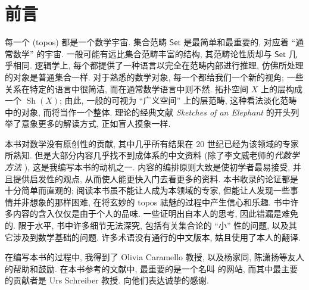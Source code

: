 \chapter{前言}


每一个\topos{} (topos) 都是一个数学宇宙. 集合范畴 $\mathsf {Set}$ 是最简单和最重要的\topos{}, 对应着 ``通常数学'' 的宇宙. 一般\topos{}可能有远比集合范畴丰富的结构, 其范畴论性质却与 $\mathsf {Set}$ 几乎相同. 逻辑学上, 每个\topos{}都提供了一种语言以完全在范畴内部进行推理, 仿佛所处理的对象是普通集合一样. 对于熟悉的数学对象, 每一个\topos{}都给我们一个新的视角; 一些关系在特定\topos{}的语言中很简洁, 而在通常数学语言中则不然. 拓扑空间 $X$ 上的层构成一个\topos{} $\operatorname{Sh}(X)$; 由此, 一般的\topos{}可视为 ``广义空间'' 上的层范畴, 这种看法淡化范畴中的对象, 而将\topos{}当作一个整体. \topos{}理论的经典文献 \textit{Sketches of an Elephant} \cite{Elephant} 的开头列举了意象更多的解读方式, 正如盲人摸象一样.

本书对数学没有原创性的贡献, 其中几乎所有结果在 20 世纪已经为该领域的专家所熟知. 但是大部分内容几乎找不到成体系的中文资料 (除了李文威老师的\emph{代数学方法} \cite{lww2}), 这是我编写本书的动机之一. 内容的编排原则大致是使初学者最易接受, 并且提供启发性的观点, 从而使人能更快入门去看更多的资料. 本书收录的论证都是十分简单而直观的; 阅读本书虽不能让人成为本领域的专家, 但能让人发现一些事情并非想象的那样困难, 在将玄妙的 topos 祛魅的过程中产生信心和乐趣. 书中许多内容的含入仅仅是由于个人的品味. 一些证明出自本人的思考, 因此错漏是难免的. 限于水平, 书中许多细节无法深究, 包括有关集合论的 ``小'' 性的问题, 以及其它涉及到数学基础的问题. 许多术语没有通行的中文版本, 姑且使用了本人的翻译.

在编写本书的过程中, 我得到了 Olivia Caramello 教授, 以及杨家同, 陈潇扬等友人的帮助和鼓励. 在本书参考的文献中, 最重要的是一个名叫 \nlab 的网站, 而其中最主要的贡献者是 Urs Schreiber 教授. 向他们表达诚挚的感谢.

\newpage

~\vspace{4em}



